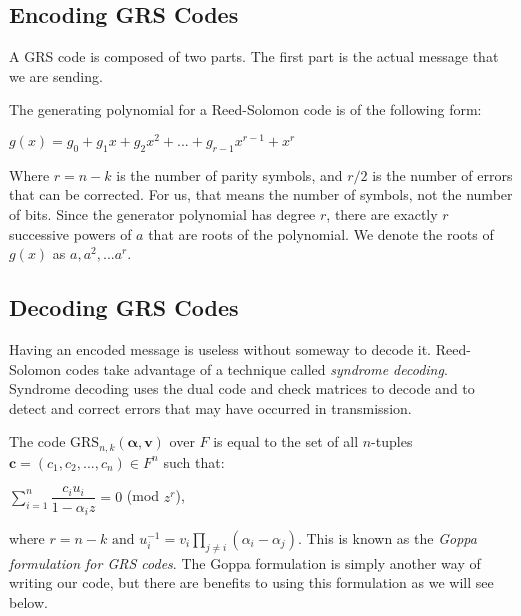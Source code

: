 \documentclass{article}
\begin{document}
\subsection{Encoding GRS Codes}
A GRS code is composed of two parts. The first part is the actual message that we are sending.

The generating polynomial for a Reed-Solomon code is of the following form:
\begin{center}
$g(x) = g_{0} + g_{1}x + g_{2}x^{2} + ... + g_{r - 1}x^{r - 1} + x^{r}$
\end{center}
Where $r = n - k$ is the number of parity symbols, and $r/2$ is the number of errors that can be corrected. For us, that means the number of symbols, not the number of bits. Since the generator polynomial has degree $r$, there are exactly $r$ successive powers of $a$ that are roots of the polynomial. We denote the roots of $g(x)$ as $a, a^{2},...a^{r}$.

\subsection{Decoding GRS Codes}
Having an encoded message is useless without someway to decode it. Reed-Solomon codes take advantage of a technique called \textit{syndrome decoding}. Syndrome decoding uses the dual code and check matrices to decode and to detect and correct errors that may have occurred in transmission. 

The code $\text{GRS}_{n,k}(\boldsymbol\alpha, \textbf{v})$ over $F$ is equal to the set of all $n$-tuples $\textbf{c} = (c_{1},c_{2},...,c_{n}) \in F^{n}$ such that:
\begin{center}
$\sum\limits_{i = 1}^{n} \dfrac{c_{i}u_{i}}{1 - \alpha_{i}z} = 0$ (mod $z^{r}$),
\end{center}
where $r = n - k \text{ and } u_{i}^{-1} = v_{i}\prod\limits_{j \neq i} (\alpha_{i} - \alpha_{j})$. This is known as the \textit{Goppa formulation for GRS codes}. The Goppa formulation is simply another way of writing our code, but there are benefits to using this formulation as we will see below.
\end{document}
